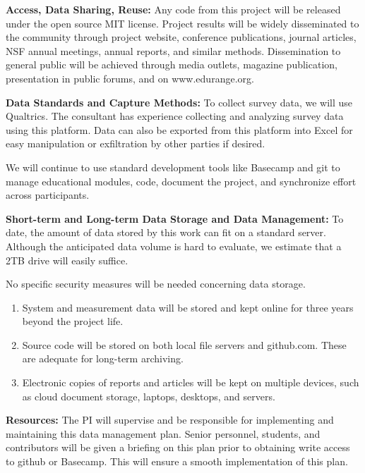 {\bf Access, Data Sharing, Reuse:} Any code from this project will be released 
under the open source MIT license.
Project results will be widely 
disseminated to the community through project website, conference publications,
journal articles, NSF annual meetings, annual reports, and similar methods.
Dissemination to general public will be achieved through media
outlets, magazine publication, presentation in public forums, and on www.edurange.org.

{\bf Data Standards and Capture Methods:} 
To collect survey data, we will use Qualtrics.  The consultant has experience
collecting and analyzing survey data using this platform.  Data can also be 
exported from this platform into Excel for easy manipulation or exfiltration
by other parties if desired.

We will continue to use standard development tools like Basecamp and git to manage 
educational modules, code, document the project, and synchronize effort across 
participants. 


{\bf Short-term and Long-term Data Storage and Data Management:} 
To date, the amount of data stored by this work can fit on a standard 
server.  Although the anticipated data volume is hard to evaluate, we 
estimate that a 2TB drive will easily suffice. 

No specific security measures will be needed 
concerning data storage. 

\begin{enumerate}
\item System and measurement data will be stored and kept online for three 
years beyond the project life.
\item Source code will be stored on both local file servers and github.com.  These are
adequate for long-term archiving.
\item Electronic copies of reports and articles will be kept on multiple 
devices, such as cloud document storage, laptops, desktops, and servers.
\end{enumerate}

{\bf Resources:}
The PI will supervise and be responsible for implementing and maintaining this 
data management plan.  Senior personnel, students, and contributors
will be given a briefing on this plan prior to obtaining write access to github
or Basecamp.  This will ensure a smooth implementation of this plan.
